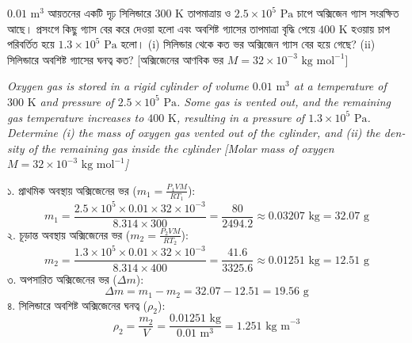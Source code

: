 \documentclass[12pt, a4paper]{article}
\begin{document}
\newpage
\begin{tcolorbox}[questionbox={প্রশ্ন (Question) 1}]
\noindent
$0.01\text{ m}^3$ আয়তনের একটি দৃঢ় সিলিন্ডারে $300\text{ K}$ তাপমাত্রায় ও $2.5 \times 10^5\text{ Pa}$ চাপে অক্সিজেন গ্যাস সংরক্ষিত আছে। প্রসংগে কিছু গ্যাস বের করে দেওয়া হলো এবং অবশিষ্ট গ্যাসের তাপমাত্রা বৃদ্ধি পেয়ে $400\text{ K}$ হওয়ায় চাপ পরিবর্তিত হয়ে $1.3 \times 10^5\text{ Pa}$ হলো। (i) সিলিন্ডার থেকে কত ভর অক্সিজেন গ্যাস বের হয়ে গেছে? (ii) সিলিন্ডারে অবশিষ্ট গ্যাসের ঘনত্ব কত? [অক্সিজেনের আণবিক ভর $M = 32 \times 10^{-3}\text{ kg mol}^{-1}$]

\vspace{0.8em}
\begin{english}
\noindent\textit{\color{darkgray}
Oxygen gas is stored in a rigid cylinder of volume $0.01\text{ m}^3$ at a temperature of $300\text{ K}$ and pressure of $2.5 \times 10^5\text{ Pa}$. Some gas is vented out, and the remaining gas temperature increases to $400\text{ K}$, resulting in a pressure of $1.3 \times 10^5\text{ Pa}$. Determine (i) the mass of oxygen gas vented out of the cylinder, and (ii) the density of the remaining gas inside the cylinder [Molar mass of oxygen $M = 32 \times 10^{-3}\text{ kg mol}^{-1}$]
}
\end{english}
\end{tcolorbox}

\vspace{1em}

\begin{tcolorbox}[solutionbox={সমাধান (Solution)}]
\noindent
১. প্রাথমিক অবস্থায় অক্সিজেনের ভর ($m_1 = \frac{P_1 V M}{R T_1}$):
\[ m_1 = \frac{2.5 \times 10^5 \times 0.01 \times 32 \times 10^{-3}}{8.314 \times 300} = \frac{80}{2494.2} \approx 0.03207\text{ kg} = 32.07\text{ g} \]
২. চূড়ান্ত অবস্থায় অক্সিজেনের ভর ($m_2 = \frac{P_2 V M}{R T_2}$):
\[ m_2 = \frac{1.3 \times 10^5 \times 0.01 \times 32 \times 10^{-3}}{8.314 \times 400} = \frac{41.6}{3325.6} \approx 0.01251\text{ kg} = 12.51\text{ g} \]
৩. অপসারিত অক্সিজেনের ভর ($\Delta m$):
\[ \Delta m = m_1 - m_2 = 32.07 - 12.51 = 19.56\text{ g} \]
৪. সিলিন্ডারে অবশিষ্ট অক্সিজেনের ঘনত্ব ($\rho_2$):
\[ \rho_2 = \frac{m_2}{V} = \frac{0.01251\text{ kg}}{0.01\text{ m}^3} = 1.251\text{ kg m}^{-3} \]
\end{tcolorbox}
\end{document}
